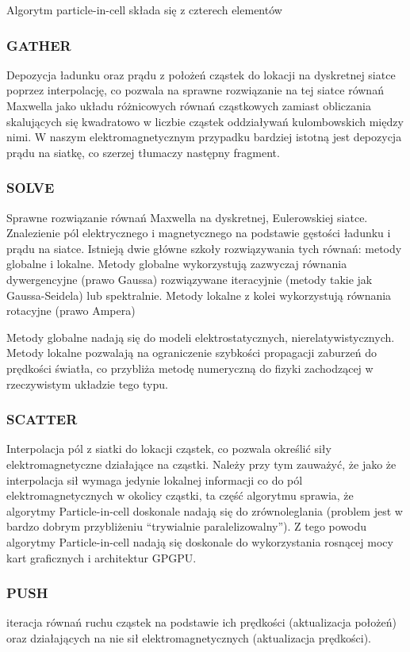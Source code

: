     Algorytm particle-in-cell składa się z czterech elementów 
    \subsubsection{GATHER}
    Depozycja ładunku oraz prądu z położeń cząstek do lokacji na dyskretnej siatce poprzez interpolację,
    co pozwala na sprawne rozwiązanie na tej siatce
    równań Maxwella jako układu różnicowych równań cząstkowych zamiast obliczania skalujących się kwadratowo w liczbie cząstek
    oddziaływań kulombowskich między nimi.
    W naszym elektromagnetycznym przypadku bardziej istotną jest depozycja prądu na siatkę, co szerzej tłumaczy następny
    fragment. 
    \subsubsection{SOLVE}
    Sprawne rozwiązanie równań Maxwella na dyskretnej, Eulerowskiej siatce.
    Znalezienie pól elektrycznego i magnetycznego
    na podstawie gęstości ładunku i prądu na siatce.
    Istnieją dwie główne szkoły rozwiązywania tych równań: metody globalne i lokalne. Metody globalne wykorzystują
    zazwyczaj równania dywergencyjne (prawo Gaussa) rozwiązywane iteracyjnie (metody takie jak Gaussa-Seidela)
    lub spektralnie.
    Metody lokalne z kolei wykorzystują równania rotacyjne (prawo Ampera) 

    Metody globalne nadają się do modeli elektrostatycznych, nierelatywistycznych.
    Metody lokalne pozwalają na ograniczenie szybkości propagacji zaburzeń do prędkości światła, co przybliża
    metodę numeryczną do fizyki zachodzącej w rzeczywistym układzie tego typu.
    \subsubsection{SCATTER}
    Interpolacja pól z siatki do lokacji cząstek, co pozwala określić siły elektromagnetyczne działające na cząstki.
    Należy przy tym zauważyć, że jako że interpolacja sił wymaga jedynie lokalnej informacji co do pól
    elektromagnetycznych w okolicy cząstki, ta część algorytmu sprawia, że algorytmy Particle-in-cell doskonale
    nadają się do zrównoleglania (problem jest w bardzo dobrym przybliżeniu ``trywialnie paralelizowalny''). Z tego powodu algorytmy
    Particle-in-cell nadają się doskonale do wykorzystania rosnącej mocy kart graficznych i architektur GPGPU.
    \subsubsection{PUSH}
    iteracja równań ruchu cząstek na podstawie ich prędkości (aktualizacja położeń)
    oraz działających na nie sił elektromagnetycznych (aktualizacja prędkości).

